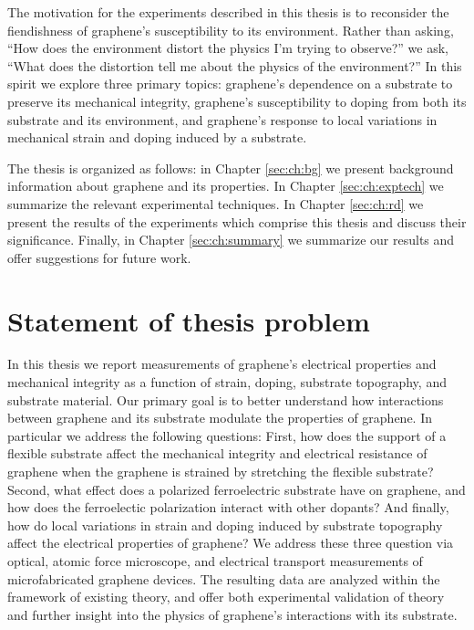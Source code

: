 \documentclass[edeposit,fullpage,draftthesis]{uiucthesis2009}
\begin{document}
    The motivation for the experiments described in this thesis is to reconsider the fiendishness
    of graphene's susceptibility to its environment. Rather than asking, ``How does the environment
    distort the physics I'm trying to observe?'' we ask, ``What does the distortion tell me about
    the physics of the environment?'' In this spirit we explore three primary topics:
    graphene's dependence on a substrate to preserve its mechanical integrity,
    graphene's susceptibility to doping from both its substrate and its environment, and
    graphene's response to local variations in mechanical strain and doping induced by a substrate.
    
    The thesis is organized as follows: in Chapter \ref{sec:ch:bg} we present background
    information about graphene and its properties. In Chapter \ref{sec:ch:exptech} we summarize
    the relevant experimental techniques. In Chapter \ref{sec:ch:rd} we present the results of the experiments
    which comprise this thesis and discuss their significance. Finally, in Chapter \ref{sec:ch:summary}
    we summarize our results and offer suggestions for future work.
    
    \section{Statement of thesis problem}
    
    In this thesis we report measurements of graphene's electrical properties and mechanical
    integrity as a function of strain, doping, substrate topography, and substrate material.
    Our primary goal is to better understand how interactions between graphene
    and its substrate modulate the properties of graphene. 
    In particular we address the following questions: 
    First, how does the support of a flexible substrate affect the mechanical integrity and 
    electrical resistance of graphene when the graphene is strained by stretching the flexible substrate?
    Second, what effect does a polarized ferroelectric substrate have on graphene, and how 
    does the ferroelectic polarization interact with other dopants? And finally, how do local
    variations in strain and doping induced by substrate topography affect the electrical properties of graphene?
    We address these three question via optical, atomic force microscope, and electrical transport
    measurements of microfabricated graphene devices. The resulting data are analyzed within the framework
    of existing theory, and offer both experimental validation of theory and further insight into
    the physics of graphene's interactions with its substrate.
    
\end{document}
